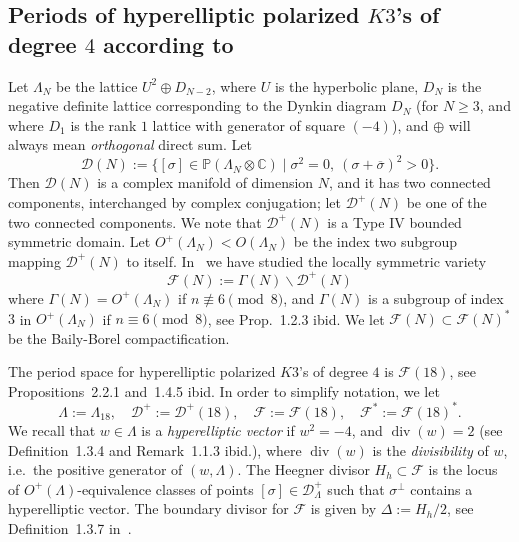 \documentclass[11pt]{amsart}
\numberwithin{equation}{section}
\theoremstyle{plain}
\theoremstyle{remark}
\theoremstyle{definition}
\newcommand{\sF}{\mathscr{F}}
\newcommand{\CC}{{\mathbb C}}
\newcommand{\cD}{{\mathscr D}}
\newcommand{\ov}{\overline}
\newcommand{\PP}{{\mathbb P}}
\DeclareMathOperator{\divisore}{div}
\begin{document}
\subsection{Periods of hyperelliptic polarized $K3$'s of degree $4$ according to~\cite{log1}}\label{subsec:predictqh}
%
Let $\Lambda_N$ be the lattice $U^2\oplus D_{N-2}$, where $U$ is the hyperbolic plane, $D_{N}$ is the negative definite lattice corresponding to the  Dynkin diagram $D_{N}$ (for $N\ge 3$, and where $D_1$ is the rank $1$ lattice with generator of square $(-4)$), and 
$\oplus$ will always mean \emph{orthogonal}  direct sum. Let
%
\begin{equation*}
%
\cD(N):=\{[\sigma] \in\PP(\Lambda_{N}\otimes\CC)\mid \sigma^2=0,\ (\sigma+\ov{\sigma})^2>0\}.
%
\end{equation*}
%
Then $\cD(N)$ is a complex manifold of dimension $N$, and it has two connected components, interchanged by complex conjugation; let $\cD^{+}(N)$ be one of the two connected components. We note that  $\cD^{+}(N)$ is a Type IV bounded symmetric domain. Let $O^{+}(\Lambda_N)< O(\Lambda_N)$ be the index two subgroup mapping $\cD^{+}(N)$ to itself. In~\cite{log1} we have studied the locally symmetric variety
%
\begin{equation*}
%
\sF(N):=\Gamma(N)\backslash\cD^{+}(N)
%
\end{equation*}
%
where $\Gamma(N)=O^{+}(\Lambda_N)$ if $n\not\equiv 6\pmod{8}$, and $\Gamma(N)$ is a subgroup of index $3$ in $O^{+}(\Lambda_N)$  if $n\equiv 6\pmod{8}$, see Prop.~1.2.3 ibid.
We let $\sF(N)\subset\sF(N)^{*}$ be  the Baily-Borel compactification. 

 The period space for hyperelliptic polarized $K3$'s of degree $4$ is $\sF(18)$, see Propositions~2.2.1 and~1.4.5 ibid. In order to simplify notation, we let
 \begin{equation}
%
\Lambda:=\Lambda_{18},\quad \cD^{+}:=\cD^{+}(18),\quad \sF:=\sF(18),\quad \sF^{*}:=\sF(18)^{*}.
%
\end{equation}
%
We recall that  $w\in\Lambda$ is a \emph{hyperelliptic vector} if $w^2=-4$, and $\divisore(w)=2$ (see Definition~1.3.4 and Remark~1.1.3  ibid.), where $\divisore(w)$ is the \emph{divisibility} of $w$, i.e.~the positive generator of 
$(w,\Lambda)$. 
The Heegner divisor $H_h\subset\sF$ is the locus of $O^{+}(\Lambda)$-equivalence classes of points $[\sigma]\in\cD^{+}_{\Lambda}$ such that $\sigma^{\bot}$  contains a hyperelliptic vector. The boundary divisor for $\sF$ is given by $\Delta:=H_h/2$, see Definition~1.3.7 in~\cite{log1}.
 
\end{document}
